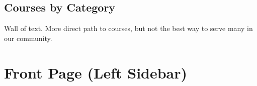 \documentclass[letterpaper,10pt,english]{sphinxmanual}
\begin{document}
{\hfill{}\hfill}


\subsection{Courses by Category}
\label{moodle:courses-by-category}
Wall of text. More direct path to courses, but not the best way to serve many in our community.

{\hfill{}\hfill}


\section{Front Page (Left Sidebar)}
\label{moodle:front-page-left-sidebar}
\end{document}
